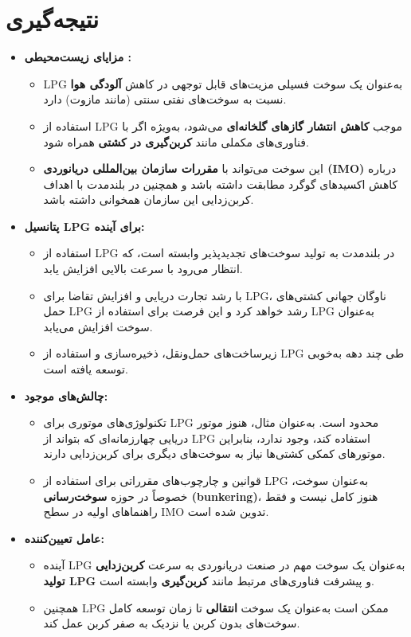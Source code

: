 \section{نتیجه‌گیری}
\begin{itemize}
	\item \textbf{مزایای زیست‌محیطی :}
	\begin{itemize}
		\item LPG به‌عنوان یک سوخت فسیلی مزیت‌های قابل توجهی در کاهش \textbf{آلودگی هوا} نسبت به سوخت‌های نفتی سنتی (مانند مازوت) دارد.
		\item استفاده از LPG موجب \textbf{کاهش انتشار گازهای گلخانه‌ای} می‌شود، به‌ویژه اگر با فناوری‌های مکملی مانند \textbf{کربن‌گیری در کشتی} همراه شود.
		\item این سوخت می‌تواند با \textbf{مقررات سازمان بین‌المللی دریانوردی (IMO)} درباره کاهش اکسیدهای گوگرد مطابقت داشته باشد و همچنین در بلندمدت با اهداف کربن‌زدایی این سازمان همخوانی داشته باشد.
	\end{itemize}
	
	\item \textbf{پتانسیل LPG برای آینده:}
	\begin{itemize}
		\item استفاده از LPG در بلندمدت به تولید سوخت‌های تجدیدپذیر وابسته است، که انتظار می‌رود با سرعت بالایی افزایش یابد.
		\item با رشد تجارت دریایی و افزایش تقاضا برای LPG، ناوگان جهانی کشتی‌های حمل LPG رشد خواهد کرد و این فرصت برای استفاده از LPG به‌عنوان سوخت افزایش می‌یابد.
		\item زیرساخت‌های حمل‌ونقل، ذخیره‌سازی و استفاده از LPG طی چند دهه به‌خوبی توسعه یافته است.
	\end{itemize}
	
	\item \textbf{چالش‌های موجود:}
	\begin{itemize}
		\item تکنولوژی‌های موتوری برای LPG محدود است. به‌عنوان مثال، هنوز موتور دریایی چهارزمانه‌ای که بتواند از LPG استفاده کند، وجود ندارد، بنابراین موتورهای کمکی کشتی‌ها نیاز به سوخت‌های دیگری برای کربن‌زدایی دارند.
		\item قوانین و چارچوب‌های مقرراتی برای استفاده از LPG به‌عنوان سوخت، خصوصاً در حوزه \textbf{سوخت‌رسانی (bunkering)}، هنوز کامل نیست و فقط راهنماهای اولیه در سطح IMO تدوین شده است.
	\end{itemize}

	\item \textbf{عامل تعیین‌کننده:}
	\begin{itemize}
		\item آینده LPG به‌عنوان یک سوخت مهم در صنعت دریانوردی به سرعت \textbf{کربن‌زدایی تولید LPG} و پیشرفت فناوری‌های مرتبط مانند \textbf{کربن‌گیری} وابسته است.
		\item همچنین LPG ممکن است به‌عنوان یک سوخت \textbf{انتقالی} تا زمان توسعه کامل سوخت‌های بدون کربن یا نزدیک به صفر کربن عمل کند.
	\end{itemize}
\end{itemize}


